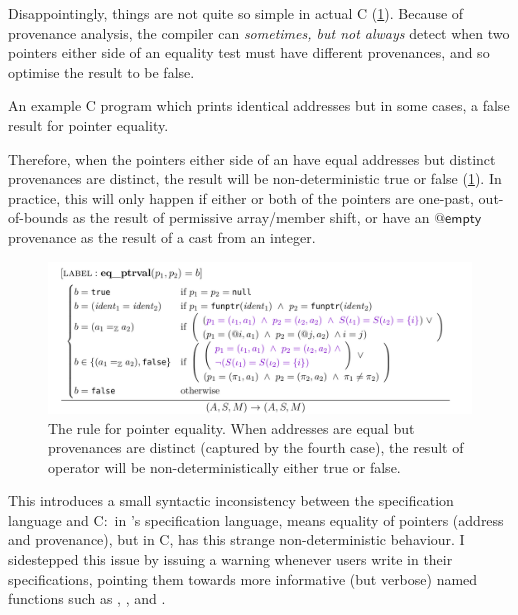 Disappointingly, things are not quite so simple in actual C
(\cref{fig:nd-ptr-eq}). Because of provenance analysis, the compiler can
\emph{sometimes, but not always} detect when two pointers either side of an
equality test must have different provenances, and so optimise the result to be
false.

\begin{marginfigure}
    \caption{An example C program which prints identical addresses but
        in some cases, a false result for pointer equality.}\label{fig:nd-ptr-eq}
\end{marginfigure}

Therefore, when the pointers either side of an \cinline{==} have equal
addresses but distinct provenances are distinct, the result will be
non-deterministic true or false (\cref{fig:nd-ptr-eq}). In practice, this will
only happen if either or both of the pointers are one-past, out-of-bounds as
the result of permissive array/member shift, or have an $@\mathsf{empty}$
provenance as the result of a cast from an integer.

\begin{figure}
    \includegraphics{figures/mem-model-pnvi-nd-ptr-eq}
    \caption{The  rule for pointer equality. When addresses
        are equal but provenances are distinct (captured by the fourth case),
        the result of \cinline{==} operator will be non-deterministically either
        true or false.}\label{fig:nd-ptr-eq}
\end{figure}

This introduces a small syntactic inconsistency between the specification
language and C:\ in 's specification language, \cninline{==} means
equality of pointers (address and provenance), but in C, \cinline{==} has
this strange non-deterministic behaviour. I sidestepped this issue by issuing a
warning whenever users write \cninline{==} in their specifications, pointing
them towards more informative (but verbose) named functions such as
, , and .

